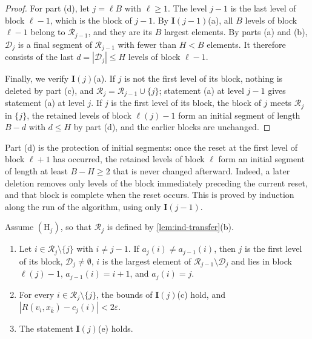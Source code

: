 \begin{proof}
For part (d), let $j={\ell}B$ with ${\ell}\ge1$. The level $j-1$ is the last level of block ${\ell}-1$, which is the block of $j-1$. By $\mathbf I(j-1)$(a), all $B$ levels of block ${\ell}-1$ belong to $\mathcal R_{j-1}$, and they are its $B$ largest elements. By parts (a) and (b), $\mathcal D_j$ is a final segment of $\mathcal R_{j-1}$ with fewer than $H<B$ elements. It therefore consists of the last $d=|\mathcal D_j|\le H$ levels of block ${\ell}-1$.

Finally, we verify $\mathbf I(j)$(a). If $j$ is not the first level of its block, nothing is deleted by part (c), and $\mathcal R_j=\mathcal R_{j-1}\cup\{j\}$; statement (a) at level $j-1$ gives statement (a) at level $j$. If $j$ is the first level of its block, the block of $j$ meets $\mathcal R_j$ in $\{j\}$, the retained levels of block ${\ell}(j)-1$ form an initial segment of length $B-d$ with $d\le H$ by part (d), and the earlier blocks are unchanged.
\end{proof}

Part (d) is the protection of initial segments: once the reset at the first level of block ${\ell}+1$ has occurred, the retained levels of block ${\ell}$ form an initial segment of length at least $B-H\ge2$ that is never changed afterward. Indeed, a later deletion removes only levels of the block immediately preceding the current reset, and that block is complete when the reset occurs. This is proved by induction along the run of the algorithm, using only $\mathbf I(j-1)$.

\begin{lemma}\label{lem:ind-successor}
Assume $(\mathrm H_j)$, so that $\mathcal R_j$ is defined by \cref{lem:ind-transfer}(b).
\begin{enumerate}[label=(\alph*)]
\item Let $i\in\mathcal R_j\setminus\{j\}$ with $i\neq j-1$. If $a_j(i)\neq a_{j-1}(i)$, then $j$ is the first level of its block, $\mathcal D_j\neq\emptyset$, $i$ is the largest element of $\mathcal R_{j-1}\setminus \mathcal D_j$ and lies in block ${\ell}(j)-1$, $a_{j-1}(i)=i+1$, and $a_j(i)=j$.
\item For every $i\in\mathcal R_j\setminus\{j\}$, the bounds of $\mathbf I(j)$(c) hold, and $|R(v_i,x_{\bar k})-c_j(i)|<2\varepsilon$.
\item The statement $\mathbf I(j)$(e) holds.
\end{enumerate}
\end{lemma}


